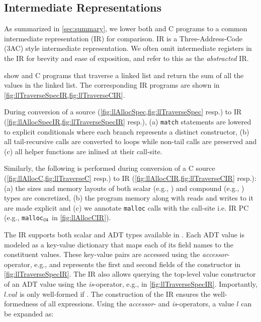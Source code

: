 \subsection{Intermediate Representations}
\label{sec:ir}
As summarized in \cref{sec:summary}, we lower both \SpecL{} and C programs to a common
intermediate representation (IR) for comparison.
IR is a Three-Address-Code (3AC) style intermediate representation.
We often omit intermediate registers in the IR for brevity and ease of exposition,
and refer to this as the {\em abstracted} IR.




 show \SpecL{} and C programs that traverse a linked list
and return the sum of all the values in the linked list.
The corresponding IR programs are shown in \cref{fig:llTraverseSpecIR,fig:llTraverseCIR}.

During conversion of a \SpecL{} source (\cref{fig:llAllocSpec,fig:llTraverseSpec} resp.)
to IR (\cref{fig:llAllocSpecIR,fig:llTraverseSpecIR} resp.),
(a) {\tt match} statements are lowered to explicit \sumDtor{} conditionals where each branch
represents a distinct constructor,
(b) all tail-recursive calls are converted to loops while non-tail calls are preserved and
(c) all helper functions are inlined at their call-site.

Similarly, the following is performed during conversion of a C source (\cref{fig:llAllocC,fig:llTraverseC} resp.)
to IR (\cref{fig:llAllocCIR,fig:llTraverseCIR} resp.):
(a) the sizes and memory layouts of both scalar (e.g., )
and compound (e.g., ) types are concretized,
(b) the program memory along with reads and writes to it are made explicit and
(c) we annotate {\tt malloc} calls with the call-site
i.e. IR PC (e.g., {\tt malloc$_{{\tt C4}}$} in \cref{fig:llAllocCIR}).

The IR supports both scalar and ADT types available in \SpecL{}.
Each ADT value is modeled as a key-value dictionary that maps
each of its field names to the constituent values.
These key-value pairs are accessed using the {\em accessor}-operator,
e.g.,  and  represents the first and second
fields of the  constructor in \cref{fig:llTraverseSpecIR}.
The IR also allows querying the top-level value constructor of an ADT value
using the {\em is}-operator, e.g.,  in \cref{fig:llTraverseSpecIR}.
Importantly, $l.val$ is only well-formed if .
The construction of the \SpecL{} IR ensures the well-formedness of all expressions.
Using the {\em accessor}- and {\em is}-operators, a  value $l$ can be expanded as:

